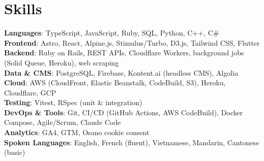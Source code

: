 \documentclass[letterpaper,11pt]{article}
\begin{document}
\section{Skills}
 \begin{itemize}[leftmargin=0.15in, label={}]
    \small{\item{
     \textbf{Languages}{: TypeScript, JavaScript, Ruby, SQL, Python, C++, C\#} \\
     \textbf{Frontend}{: Astro, React, Alpine.js, Stimulus/Turbo, D3.js, Tailwind CSS, Flutter} \\
     \textbf{Backend}{: Ruby on Rails, REST APIs, Cloudflare Workers, background jobs (Solid Queue, Heroku), web scraping} \\
     \textbf{Data \& CMS}{: PostgreSQL, Firebase, Kontent.ai (headless CMS), Algolia} \\
     \textbf{Cloud}{: AWS (CloudFront, Elastic Beanstalk, CodeBuild, S3), Heroku, Cloudflare, GCP} \\
     \textbf{Testing}{: Vitest, RSpec (unit \& integration)} \\
     \textbf{DevOps \& Tools}{: Git, CI/CD (GitHub Actions, AWS CodeBuild), Docker Compose, Agile/Scrum, Claude Code} \\
     \textbf{Analytics}{: GA4, GTM, Osano cookie consent} \\
     \textbf{Spoken Languages}{: English, French (fluent), Vietnamese, Mandarin, Cantonese (basic)}
    }}
 \end{itemize}


\end{document}
